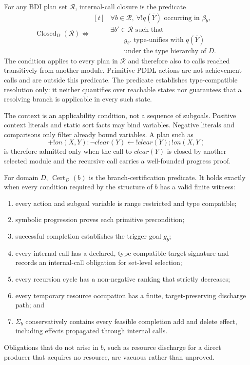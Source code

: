 \begin{definition}
For any BDI plan set $\mathcal R$, internal-call closure is the predicate
\[
\operatorname{Closed}_D(\mathcal R)
\Longleftrightarrow
\begin{aligned}[t]
&\forall b\in\mathcal R,\ \forall !q(\bar Y)\text{ occurring in }\beta_b,\\
&\exists b'\in\mathcal R\text{ such that}\\
&\qquad g_{b'}\text{ type-unifies with }q(\bar Y)\\
&\qquad\text{under the type hierarchy of }D.
\end{aligned}
\]
The condition applies to every plan in $\mathcal R$ and therefore also to calls
reached transitively from another module. Primitive PDDL actions are not
achievement calls and are outside this predicate. The predicate establishes
type-compatible resolution only: it neither quantifies over reachable states
nor guarantees that a resolving branch is applicable in every such state.
\end{definition}

The context is an applicability condition, not a sequence of subgoals. Positive
context literals and static sort facts may bind variables. Negative literals
and comparisons only filter already bound variables. A plan such as
\[
+!on(X,Y):\neg clear(Y)\leftarrow !clear(Y);!on(X,Y)
\]
is therefore admitted only when the call to $clear(Y)$ is closed by another
selected module and the recursive call carries a well-founded progress proof.

\begin{definition}
For domain $D$, $\operatorname{Cert}_D(b)$ is the branch-certification predicate.
It holds exactly when every condition required by the structure of $b$ has a
valid finite witness:
\begin{enumerate}
\item every action and subgoal variable is range restricted and type compatible;
\item symbolic progression proves each primitive precondition;
\item successful completion establishes the trigger goal $g_b$;
\item every internal call has a declared, type-compatible target signature and
records an internal-call obligation for set-level selection;
\item every recursion cycle has a non-negative ranking that strictly decreases;
\item every temporary resource occupation has a finite, target-preserving
discharge path; and
\item $\Sigma_b$ conservatively contains every feasible completion add and delete
effect, including effects propagated through internal calls.
\end{enumerate}
Obligations that do not arise in $b$, such as resource discharge for a direct
producer that acquires no resource, are vacuous rather than unproved.
\end{definition}


